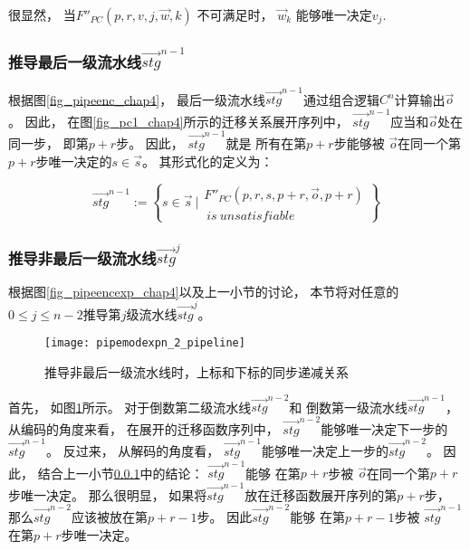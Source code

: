 很显然，
当$F''_{PC}(p,r,v,j,\vec{w},k)$ 不可满足时，
$\vec{w}_k$ 能够唯一决定$v_j$.


\subsubsection{推导最后一级流水线$\vec{stg}^{n-1}$}\label{subsub_last}
根据图\ref{fig_pipeenc_chap4}，
最后一级流水线$\vec{stg}^{n-1}$通过组合逻辑$C^n$计算输出$\vec{o}$。
因此，
在图\ref{fig_pc1_chap4}所示的迁移关系展开序列中，
$\vec{stg}^{n-1}$应当和$\vec{o}$处在同一步，
即第$p+r$步。
因此，
$\vec{stg}^{n-1}$就是
所有在第$p+r$步能够被
$\vec{o}$在同一个第$p+r$步唯一决定的$s\in \vec{s}$。
其形式化的定义为：

\begin{equation}\label{stgn_1}
 \vec{stg}^{n-1} :=
\left\{
 s\in \vec{s} ~|
\begin{array}{cc}
 F''_{PC}(p,r,
 s,p+r,
 \vec{o},p+r)\\
 ~is~unsatisfiable
\end{array}
\right\}
\end{equation}

\subsubsection{推导非最后一级流水线$\vec{stg}^{j}$}

根据图\ref{fig_pipeencexp_chap4}以及上一小节的讨论，
本节将对任意的$0\le j\le n-2$推导第$j$级流水线$\vec{stg}^{j}$。



\begin{figure}[t]
\begin{center}
\texttt{[image: pipemodexpn\_2\_pipeline]}
\end{center}
\caption{推导非最后一级流水线时，上标和下标的同步递减关系}
  \label{fig_pipemodexpn_2_pipeline}
\end{figure}

首先，
如图\ref{fig_pipemodexpn_2_pipeline}所示。
对于倒数第二级流水线$\vec{stg}^{n-2}$和
倒数第一级流水线$\vec{stg}^{n-1}$，
从编码的角度来看，
在展开的迁移函数序列中，
$\vec{stg}^{n-2}$能够唯一决定下一步的$\vec{stg}^{n-1}$。
反过来，
从解码的角度看，
$\vec{stg}^{n-1}$能够唯一决定上一步的$\vec{stg}^{n-2}$。
因此，
结合上一小节\ref{subsub_last}中的结论：
$\vec{stg}^{n-1}$能够
在第$p+r$步被
$\vec{o}$在同一个第$p+r$步唯一决定。
那么很明显，
如果将$\vec{stg}^{n-1}$放在迁移函数展开序列的第$p+r$步，
那么$\vec{stg}^{n-2}$应该被放在第$p+r-1$步。
因此$\vec{stg}^{n-2}$能够
在第$p+r-1$步被
$\vec{stg}^{n-1}$在第$p+r$步唯一决定。

